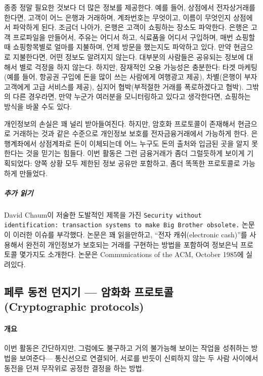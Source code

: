 \documentclass[]{article}
\begin{document}
종종 정말 필요한 것보다 더 많은 정보를 제공한다. 예를 들어, 상점에서
전자상거래를 한다면, 고객이 어느 은행과 거래하며, 계좌번호는 무엇이고,
이름이 무엇인지 상점에서 파악하게 된다. 조금더 나아가, 은행은 고객이
쇼핑하는 장소도 파악한다. 은행은 고객 프로파일을 만들어서, 주유는 어디서
하고, 식료품을 어디서 구입하며, 매번 쇼핑할 때 쇼핑항목별로 얼마를
지불하며, 언제 방문을 했는지도 파악하고 있다. 만약 현금으로 지불한다면,
어떤 정보도 알려지지 않는다. 대부분의 사람들은 공유되는 정보에 대해서
별로 걱정을 하지 않는다. 하지만, 잠재적인 오용 가능성은 충분한다: 타겟
마케팅 (예를 들어, 항공권 구입에 돈을 많이 쓰는 사람에게 여행광고 제공),
차별(은행이 부자 고객에게 고급 서비스를 제공), 심지어 협박(부적절한
거래를 폭로하겠다고 협박). 그밖의 다른 경우라면, 만약 누군가 여러분을
모니터링하고 있다고 생각한다면, 쇼핑하는 방식을 바꿀 수도 있다.

개인정보의 손실은 꽤 널리 받아들여진다. 하지만, 암호화 프로토콜이
존재해서 현금으로 거래하는 것과 같은 수준으로 개인정보 보호를
전자금융거래에서 가능하게 한다. 은행계좌에서 상점계좌로 돈이 이체되는데
어느 누구도 돈의 출처와 입금된 곳을 알지 못한다는 것을 믿기는 힘들다.
이번 활동은 그런 금융거래가 좀더 그럴듯하게 보이게 기획되었다: 양쪽 상황
모두 제한된 정보 공유만 포함하고, 좀더 똑똑한 프로토콜로 가능하게
만들었다.

\subparagraph{추가 읽기}\label{section-234}

David Chaum이 저술한 도발적인 제목을 가진
\texttt{Security without identification: transaction systems to make Big Brother obsolete.}
논문이 이러한 이슈를 부각했다. 논문은 꽤 읽을만하고, ``전자
캐쉬(electronic cash)''를 사용해서 완전히 개인정보가 보호되는 거래를
구현하는 방법을 포함하여 정보은닉 프로토콜 몇가지도 소개한다. 논문은
Communications of the ACM, October 1985에 실려있다.

\subsection{페루 동전 던지기 --- 암화화 프로토콜 (Cryptographic
protocols)}\label{mdash---cryptographic-protocols}

\mbox{}\paragraph{개요}\label{section-235}

이번 활동은 간단하지만, 그럼에도 불구하고 거의 불가능해 보이는 작업을
성취하는 방법을 보여준다--- 통신선으로 연결되어, 서로를 반듯이 신뢰하지
않는 두 사람 사이에서 동전을 던져 무작위로 공정한 결정을 하는 방법.
\end{document}

